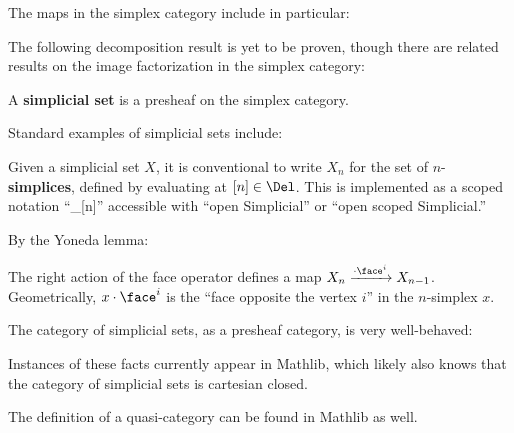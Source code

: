 
The maps in the simplex category include in particular:



The following decomposition result is yet to be proven, though there are related results on the image factorization in the simplex category:



\begin{defn}\label{defn:simplicial-set}
  \leanok
  A \textbf{simplicial set} is a presheaf on the simplex category.
\end{defn}


Standard examples of simplicial sets include:




Given a simplicial set $X$, it is conventional to write $X_n$ for the set of $n$-\textbf{sim\-plices}, defined by evaluating at $[n] \in \Del$. This is implemented as a scoped notation ``\_[n]'' accessible with ``open Simplicial'' or ``open scoped Simplicial.''

By the Yoneda lemma:



The right action of the face operator defines a map $X_n \xrightarrow{\cdot\face^i} X_{n-1}$. Geometrically, $x\cdot \face^i$ is the ``face opposite the vertex $i$'' in the $n$-simplex $x$.

The category of simplicial sets, as a presheaf category, is very well-behaved:






Instances of these facts currently appear in Mathlib, which likely also knows that the category of simplicial sets is cartesian closed.

The definition of a quasi-category can be found in Mathlib as well.



